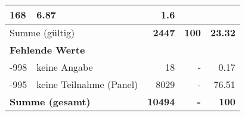 \begin{longtable}{lXrrr}
       \num{168} &
       \num[round-mode=places,round-precision=2]{6.87} &
         \num[round-mode=places,round-precision=2]{1.6} \\
     \midrule
     \multicolumn{2}{l}{Summe (gültig)} &
       \textbf{\num{2447}} &
     \textbf{\num{100}} &
       \textbf{\num[round-mode=places,round-precision=2]{23.32}} \\
     \multicolumn{5}{l}{\textbf{Fehlende Werte}}\\
       -998 &
       keine Angabe &
         \num{18} &
        - &
         \num[round-mode=places,round-precision=2]{0.17} \\
       -995 &
       keine Teilnahme (Panel) &
         \num{8029} &
        - &
         \num[round-mode=places,round-precision=2]{76.51} \\
     \midrule
     \multicolumn{2}{l}{\textbf{Summe (gesamt)}} &
          \textbf{\num{10494}} &
        \textbf{-} &
        \textbf{\num{100}} \\
     \bottomrule
     \end{longtable}
     
